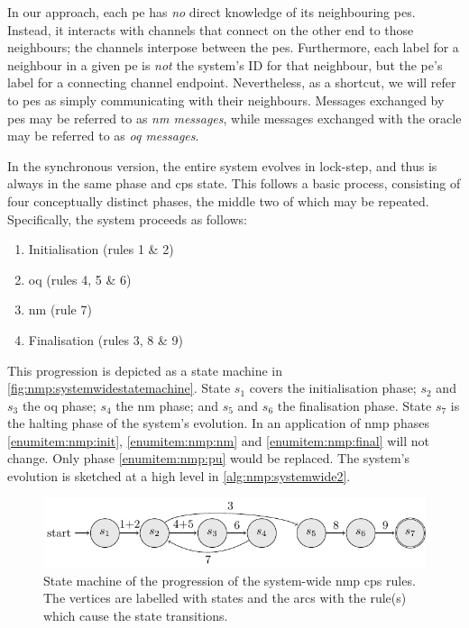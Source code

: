 In our approach, each \gls{pe} has \emph{no} direct knowledge of its neighbouring \glspl{pe}.  Instead, it interacts with channels that connect on the other end to those neighbours; the channels interpose between the \glspl{pe}.  Furthermore, each label for a neighbour in a given \gls{pe} is \emph{not} the system's ID for that neighbour, but the \gls{pe}'s label for a connecting channel endpoint.  Nevertheless, as a shortcut, we will refer to \glspl{pe} as simply communicating with their neighbours.  Messages exchanged by \glspl{pe} may be referred to as \emph{\acrfull{nm} messages}, while messages exchanged with the oracle may be referred to as \emph{\acrfull{oq} messages}.

In the synchronous version, the entire system evolves in lock-step, and thus is always in the same phase and \gls{cps} state.  This follows a basic process, consisting of four conceptually distinct phases, the middle two of which may be repeated.  Specifically, the system proceeds as follows:

\begin{enumerate}
    \item\label{enumitem:nmp:init} Initialisation (rules 1 \& 2)
    \item\label{enumitem:nmp:pu} \Gls{oq} (rules 4, 5 \& 6)
    \item\label{enumitem:nmp:nm} \Gls{nm} (rule 7)
    \item\label{enumitem:nmp:final} Finalisation (rules 3, 8 \& 9)
\end{enumerate}

This progression is depicted as a state machine in \autoref{fig:nmp:systemwidestatemachine}.  State \(s_1\) covers the initialisation phase; \(s_2\) and \(s_3\) the \gls{oq} phase; \(s_4\) the \gls{nm} phase; and \(s_5\) and \(s_6\) the finalisation phase.  State \(s_7\) is the halting phase of the system's evolution.  In an application of \gls{nmp} phases \ref{enumitem:nmp:init}, \ref{enumitem:nmp:nm} and \ref{enumitem:nmp:final} will not change.  Only phase \ref{enumitem:nmp:pu} would be replaced.  The system's evolution is sketched at a high level in \autoref{alg:nmp:systemwide2}.

\begin{figure}
    \centering
    \includegraphics{chapters/nmp/images/systemwidestatemachine.pdf}
    \caption{State machine of the progression of the system-wide \gls{nmp} \gls{cps} rules.  The vertices are labelled with states and the arcs with the rule(s) which cause the state transitions.}
    \label{fig:nmp:systemwidestatemachine}
\end{figure}

